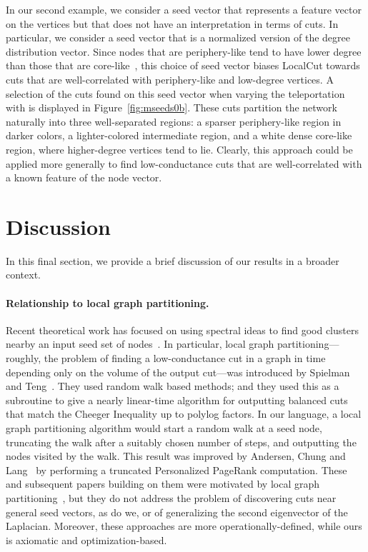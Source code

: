 \documentclass[11pt]{article}
\begin{document}
In our second example, we consider a seed vector that represents a feature 
vector on the vertices but that does not have an interpretation in terms of 
cuts. 
In particular, we consider a seed vector that is a normalized version of the 
degree distribution vector. 
Since nodes that are periphery-like tend to have lower degree than those that
are core-like~\cite{LLDM08_communities_CONF,LLDM09_communities_IM,LLM10_communities_CONF},
this choice of seed vector biases \textsf{LocalCut} 
towards cuts that are well-correlated with periphery-like and low-degree 
vertices.
A selection of the cuts found on this seed vector when varying the 
teleportation with  is displayed in Figure~\ref{fig:mseeds0b}. 
These cuts partition the network naturally into three well-separated 
regions: a sparser periphery-like region in darker colors, a lighter-colored 
intermediate region, and a white dense core-like region, where higher-degree 
vertices tend to lie. 
Clearly, this approach could be applied more generally to find 
low-conductance cuts that are well-correlated with a known feature of the 
node vector.




\section{Discussion}
\label{sxn:discussion}

In this final section, we provide a brief discussion of our results in a 
broader context.

\paragraph{Relationship to local graph partitioning.} 
Recent theoretical work has focused on using spectral ideas to find good 
clusters nearby an input seed set of 
nodes~\cite{Spielman:2004,andersen06local,chung07_fourproofs}. 
In particular, local graph partitioning---roughly, the problem of finding a 
low-conductance cut in a graph in time depending only on the volume of the 
output cut---was introduced by Spielman and Teng~\cite{Spielman:2004}. 
They used random walk based methods; and they used this as a subroutine to 
give a nearly linear-time algorithm for outputting balanced cuts that match 
the Cheeger Inequality up to polylog factors. 
In our language, a local graph partitioning algorithm would start a random 
walk at a seed node, truncating the walk after a suitably chosen number of 
steps, and outputting the nodes visited by the walk. 
This result was improved  by Andersen, Chung and Lang~\cite{andersen06local} 
by performing a truncated Personalized PageRank computation. 
These and subsequent papers building on them were motivated by local graph 
partitioning~\cite{chung07_fourproofs}, but they do not address the problem 
of discovering cuts near general seed vectors, as do we, or of generalizing 
the second eigenvector of the Laplacian. 
Moreover, these approaches are more operationally-defined, while ours is 
axiomatic and optimization-based. 
\end{document}
